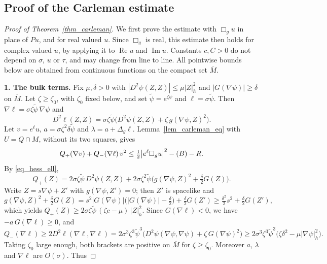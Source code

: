 \documentclass[12pt,reqno]{amsart}
\numberwithin{equation}{section}
\theoremstyle{definition}
\theoremstyle{plain}
\theoremstyle{definition}
\theoremstyle{definition}
\newcommand{\uu}{M}
\let\div\relax
\DeclareMathOperator{\div}{div}
\let\div\relax
\DeclareMathOperator{\div}{div}
\begin{document}
\subsection{Proof of the Carleman estimate}\label{sec_proof_carleman}
\begin{proof}[Proof of Theorem~\ref{thm_carleman}]

We first prove the estimate with $\Box_gu$ in place of $Pu$, and for real valued $u$. Since $\Box_g$ is real, this estimate then holds for complex valued $u$, by applying it to $\operatorname{Re}u$ and $\operatorname{Im}u$. Constants $c,C>0$ do not depend on $\sigma$, $u$ or $\tau$, and may change from line to line. All pointwise bounds below are obtained from continuous functions on the compact set $\overline\uu$.


\medskip\noindent
\textbf{1. The bulk terms.}
Fix $\mu,\delta>0$ with $|D^2\psi(Z,Z)|\le\mu|Z|_h^2$ and $|G(\nabla\psi)|\ge\delta$ on $\overline\uu$. Let $\zeta\ge\zeta_0$, with $\zeta_0$ fixed below, and set $\tilde\psi=e^{\zeta\psi}$ and $\ell=\sigma\tilde\psi$. Then $\nabla\ell=\sigma\zeta\tilde\psi\,\nabla\psi$ and
\begin{equation}\label{eq_hess_ell}
D^2\ell(Z,Z)=\sigma\zeta\tilde\psi\bigl(D^2\psi(Z,Z)+\zeta\,g(\nabla\psi,Z)^2\bigr).
\end{equation}
Let $v=e^\ell u$, $a=\sigma\zeta^2\delta\tilde\psi$ and $\lambda=a+\Delta_g\ell$. Lemma~\ref{lem_carleman_eq} with $U=Q\cap\uu$, without its two squares, gives
\begin{equation}\label{star}
Q_+(\nabla v)+Q_-(\nabla\ell)\,v^2\le\tfrac12\bigl|e^\ell\Box_gu\bigr|^2-\div(B)-R .
\end{equation}
By \eqref{eq_hess_ell},
\[
Q_+(Z)=2\sigma\zeta\tilde\psi\,D^2\psi(Z,Z)+2\sigma\zeta^2\tilde\psi\bigl(g(\nabla\psi,Z)^2+\tfrac\delta2G(Z)\bigr).
\]
Write $Z=s\nabla\psi+Z'$ with $g(\nabla\psi,Z')=0$; then $Z'$ is spacelike and
\[
g(\nabla\psi,Z)^2+\tfrac\delta2G(Z)=s^2|G(\nabla\psi)|\bigl(|G(\nabla\psi)|-\tfrac\delta2\bigr)+\tfrac\delta2G(Z')\ge\tfrac{\delta^2}2s^2+\tfrac\delta2G(Z'),
\]
which yields $Q_+(Z)\ge2\sigma\zeta\tilde\psi\,(\zeta c-\mu)\,|Z|_h^2$.
Since $G(\nabla\ell)<0$, we have $-a\,G(\nabla\ell)\ge0$, and
\[
Q_-(\nabla\ell)\ge2D^2\ell(\nabla\ell,\nabla\ell)=2\sigma^3\zeta^3\tilde\psi^3\bigl(D^2\psi(\nabla\psi,\nabla\psi)+\zeta\,G(\nabla\psi)^2\bigr)\ge2\sigma^3\zeta^3\tilde\psi^3\bigl(\zeta\delta^2-\mu|\nabla\psi|_h^2\bigr).
\]
Taking $\zeta_0$ large enough, both brackets are positive on $\overline\uu$ for $\zeta\ge\zeta_0$. Moreover $a$, $\lambda$ and $\nabla\ell$ are $O(\sigma)$. Thus

\end{proof}
\end{document}
